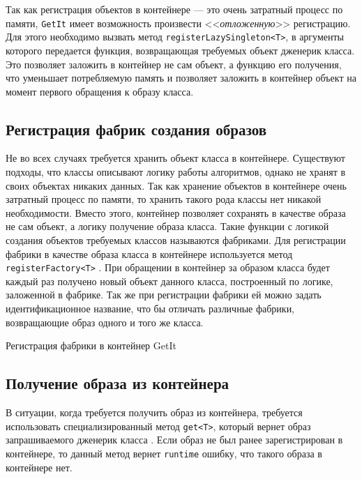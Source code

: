 Так как регистрация объектов в контейнере --- это очень затратный процесс
по памяти, \texttt{GetIt} имеет возможность
произвести <<\textit{отложенную}>> регистрацию.
Для этого необходимо вызвать метод \texttt{registerLazySingleton<T>},
в аргументы которого передается функция,
возвращающая требуемых объект дженерик класса.
Это позволяет заложить в контейнер не сам объект, а функцию его получения,
что уменьшает потребляемую память
и позволяет заложить в контейнер объект на момент первого обращения
к образу класса.

\subsection{Регистрация фабрик создания образов}

Не во всех случаях требуется хранить объект класса в контейнере.
Существуют подходы, что классы описывают логику работы алгоритмов,
однако не хранят в своих объектах никаких данных.
Так как хранение объектов в контейнере очень затратный процесс по памяти,
то хранить такого рода классы нет никакой необходимости.
Вместо этого, контейнер позволяет сохранять в качестве образа не сам объект,
а логику получение образа класса.
Такие функции с логикой создания объектов
требуемых классов называются фабриками.
Для регистрации фабрики в качестве образа класса
в контейнере используется метод \texttt{registerFactory<T>}
.
При обращении в контейнер за образом класса будет каждый раз получено
новый объект данного класса, построенный по логике, заложенной в фабрике.
Так же при регистрации фабрики ей можно задать идентификационное название,
что бы отличать различные фабрики, возвращающие образ одного и того же класса.

\begin{image}
	\caption{Регистрация фабрики в контейнер GetIt}
	\label{fig:getit:registration:factory}
\end{image}

\subsection{Получение образа из контейнера}

В ситуации, когда требуется получить образ из контейнера,
требуется использовать специализированный метод \texttt{get<T>},
который вернет образ запрашиваемого дженерик класса
.
Если образ не был ранее зарегистрирован в контейнере,
то данный метод вернет \texttt{runtime} ошибку,
что такого образа в контейнере нет.

